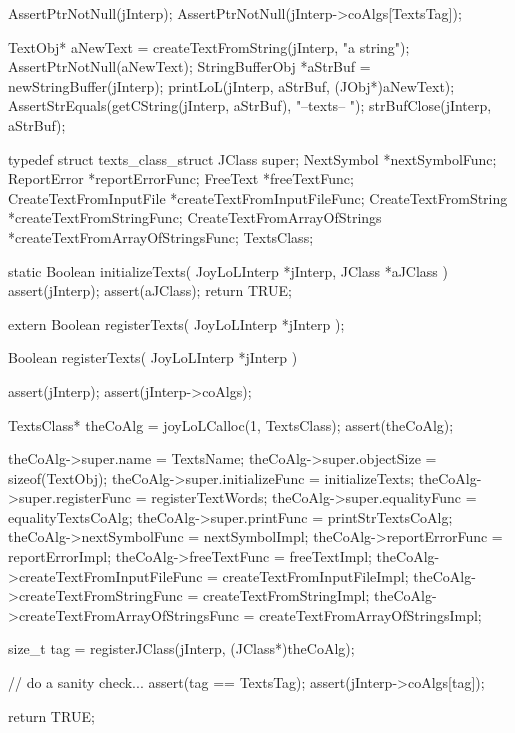 
\startCTest
  AssertPtrNotNull(jInterp);
  AssertPtrNotNull(jInterp->coAlgs[TextsTag]);

  TextObj* aNewText = createTextFromString(jInterp, "a string");
  AssertPtrNotNull(aNewText);
  StringBufferObj *aStrBuf = newStringBuffer(jInterp);
  printLoL(jInterp, aStrBuf, (JObj*)aNewText);
  AssertStrEquals(getCString(jInterp, aStrBuf), "--texts-- ");
  strBufClose(jInterp, aStrBuf);
\stopCTest
\stopTestCase
\stopTestSuite

\startTestSuite[registerTexts]

\startCHeader
typedef struct texts_class_struct {
  JClass                    super;
  NextSymbol                   *nextSymbolFunc;
  ReportError                  *reportErrorFunc;
  FreeText                     *freeTextFunc;
  CreateTextFromInputFile      *createTextFromInputFileFunc;
  CreateTextFromString         *createTextFromStringFunc;
  CreateTextFromArrayOfStrings *createTextFromArrayOfStringsFunc;
} TextsClass;
\stopCHeader

\startCCode
static Boolean initializeTexts(
  JoyLoLInterp *jInterp,
  JClass   *aJClass
) {
  assert(jInterp);
  assert(aJClass);
  return TRUE;
}
\stopCCode

\startCHeader
extern Boolean registerTexts(
  JoyLoLInterp *jInterp
);
\stopCHeader
{}

\startCCode
Boolean registerTexts(
  JoyLoLInterp *jInterp
) {
  assert(jInterp);
  assert(jInterp->coAlgs);
  
  TextsClass* theCoAlg = joyLoLCalloc(1, TextsClass);
  assert(theCoAlg);
  
  theCoAlg->super.name           = TextsName;
  theCoAlg->super.objectSize     = sizeof(TextObj);
  theCoAlg->super.initializeFunc = initializeTexts;
  theCoAlg->super.registerFunc   = registerTextWords;
  theCoAlg->super.equalityFunc   = equalityTextsCoAlg;
  theCoAlg->super.printFunc      = printStrTextsCoAlg;
  theCoAlg->nextSymbolFunc       = nextSymbolImpl;
  theCoAlg->reportErrorFunc      = reportErrorImpl;
  theCoAlg->freeTextFunc         = freeTextImpl;
  theCoAlg->createTextFromInputFileFunc = 
    createTextFromInputFileImpl;
  theCoAlg->createTextFromStringFunc =
    createTextFromStringImpl;
  theCoAlg->createTextFromArrayOfStringsFunc =
    createTextFromArrayOfStringsImpl;

  size_t tag =
    registerJClass(jInterp, (JClass*)theCoAlg);
  
  // do a sanity check...
  assert(tag == TextsTag);
  assert(jInterp->coAlgs[tag]);

  return TRUE;
}
\stopCCode

